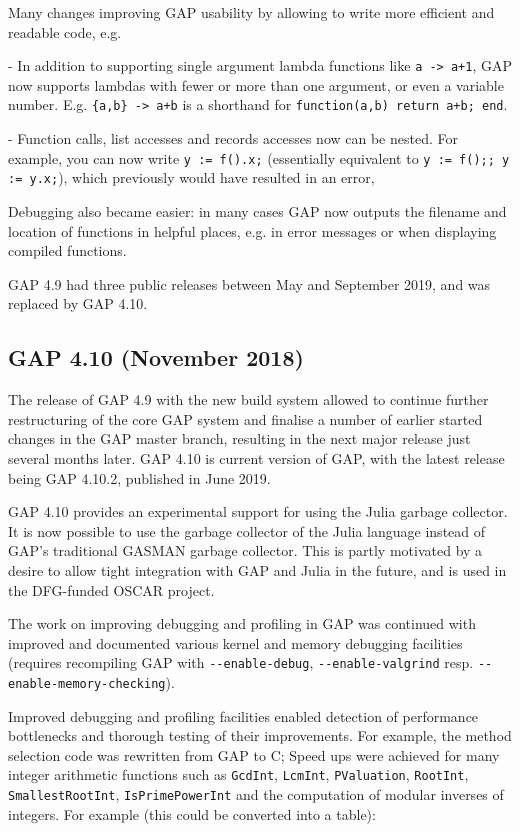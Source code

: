 \documentclass{deliverablereport}
\begin{document}
Many changes improving GAP usability by allowing to write more
efficient and readable code, e.g.

- In addition to supporting single argument lambda functions 
like \verb|a -> a+1|, GAP now supports lambdas with fewer or more 
than one argument, or even a variable number. 
E.g. \verb|{a,b} -> a+b| is a shorthand for \verb|function(a,b) return a+b; end|. %

- Function calls, list accesses and records accesses now can be nested. 
For example, you can now write \verb|y := f().x;| 
(essentially equivalent to \verb|y := f();; y := y.x;|),
which previously would have resulted in an error, %

Debugging also became easier: in many cases GAP now outputs the filename 
and location of functions in helpful places, e.g. in error messages or when 
displaying compiled functions.

GAP 4.9 had three public releases between May and September 2019, and
was replaced by GAP 4.10.

\subsection{GAP 4.10 (November 2018)}\label{gap-4.10}

The release of GAP 4.9 with the new build system allowed to continue
further restructuring of the core GAP system and finalise a number of
earlier started changes in the GAP master branch, resulting in the 
next major release just several months later. GAP 4.10 is current version
of GAP, with the latest release being GAP 4.10.2, published in June 2019.

GAP 4.10 provides an experimental support for using the Julia garbage collector.
It is now possible to use the garbage collector of the Julia language 
instead of GAP's traditional GASMAN garbage collector. This is partly 
motivated by a desire to allow tight integration with GAP and Julia 
in the future, and is used in the DFG-funded OSCAR project.

The work on improving debugging and profiling in GAP was continued
with improved and documented various kernel and memory debugging facilities 
(requires recompiling GAP with \verb|--enable-debug|,
\verb|--enable-valgrind| resp. \verb|--enable-memory-checking|).

Improved debugging and profiling facilities enabled detection of 
performance bottlenecks and thorough testing of their improvements.
For example, the method selection code was rewritten from GAP to C; %
Speed ups were achieved for many integer arithmetic functions such as
\verb|GcdInt|, \verb|LcmInt|, \verb|PValuation|, 
\verb|RootInt|, \verb|SmallestRootInt|, \verb|IsPrimePowerInt|
and the computation of modular inverses of integers. %
For example (this could be converted into a table):
\end{document}
